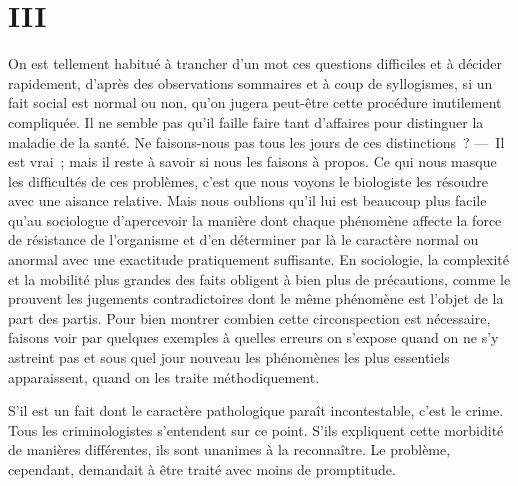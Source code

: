 \documentclass[french,twoside]{book} %
\begin{document}
\section[{III}]{III}
\noindent On est tellement habitué à trancher d’un mot ces questions difficiles et à décider rapidement, d’après des observations sommaires et à coup de syllogismes, si un fait social est normal ou non, qu’on jugera peut-être cette procédure inutilement compliquée. Il ne semble pas qu’il faille faire tant d’affaires pour distinguer la maladie de la santé. Ne faisons-nous pas tous les jours de ces distinctions ? — Il est vrai ; mais il reste à savoir si nous les faisons à propos. Ce qui nous masque les difficultés de ces problèmes, c’est que nous voyons le biologiste les résoudre avec une aisance relative. Mais nous oublions qu’il lui est beaucoup plus facile qu’au sociologue d’apercevoir la manière dont chaque phénomène affecte la force de résistance de l’organisme et d’en déterminer par là le caractère normal ou anormal avec une exactitude pratiquement suffisante. En sociologie, la complexité et la mobilité plus grandes des faits obligent à bien plus de précautions, comme le prouvent les jugements contradictoires dont le même phénomène est l’objet de la part des partis. Pour bien montrer combien cette circonspection est nécessaire, faisons voir par quelques exemples à quelles erreurs on s’expose quand on ne s’y astreint pas et sous quel jour nouveau les phénomènes les plus essentiels apparaissent, quand on les traite méthodiquement.\par
S’il est un fait dont le caractère pathologique paraît incontestable, c’est le crime. Tous les criminologistes s’entendent sur ce point. S’ils expliquent cette morbidité de manières différentes, ils sont unanimes à la reconnaître. Le problème, cependant, demandait à être traité avec moins de promptitude.\par
\end{document}
